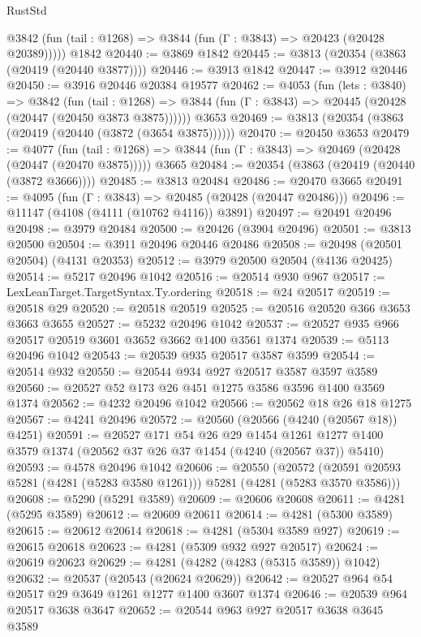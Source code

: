 \begin{lexlean}{RustStd}
\begin{coremodule}
      @3842 (fun (tail : @1268) => @3844 (fun (Γ : @3843) => @20423 (@20428 @20389)))))
    @1842
@20440 := @3869 @1842
@20445 := @3813 (@20354 (@3863 (@20419 (@20440 @3877))))
@20446 := @3913 @1842
@20447 := @3912 @20446
@20450 := @3916 @20446 @20384 @19577
@20462 := @4053
    (fun (lets : @3840) =>
    @3842
      (fun (tail : @1268) =>
      @3844 (fun (Γ : @3843) => @20445 (@20428 (@20447 (@20450 @3873 @3875))))))
    @3653
@20469 := @3813 (@20354 (@3863 (@20419 (@20440 (@3872 (@3654 @3875))))))
@20470 := @20450 @3653
@20479 := @4077
    (fun (tail : @1268) => @3844 (fun (Γ : @3843) => @20469 (@20428 (@20447 (@20470 @3875)))))
    @3665
@20484 := @20354 (@3863 (@20419 (@20440 (@3872 @3666))))
@20485 := @3813 @20484
@20486 := @20470 @3665
@20491 := @4095 (fun (Γ : @3843) => @20485 (@20428 (@20447 @20486)))
@20496 := @11147 (@4108 (@4111 (@10762 @4116)) @3891)
@20497 := @20491 @20496
@20498 := @3979 @20484
@20500 := @20426 (@3904 @20496)
@20501 := @3813 @20500
@20504 := @3911 @20496 @20446 @20486
@20508 := @20498 (@20501 @20504) (@4131 @20353)
@20512 := @3979 @20500 @20504 (@4136 @20425)
@20514 := @5217 @20496 @1042
@20516 := @20514 @930 @967
@20517 := LexLeanTarget.TargetSyntax.Ty.ordering
@20518 := @24 @20517
@20519 := @20518 @29
@20520 := @20518 @20519
@20525 := @20516 @20520 @366 @3653 @3663 @3655
@20527 := @5232 @20496 @1042
@20537 := @20527 @935 @966 @20517 @20519 @3601 @3652 @3662 @1400 @3561 @1374
@20539 := @5113 @20496 @1042
@20543 := @20539 @935 @20517 @3587 @3599
@20544 := @20514 @932
@20550 := @20544 @934 @927 @20517 @3587 @3597 @3589
@20560 := @20527 @52 @173 @26 @451 @1275 @3586 @3596 @1400 @3569 @1374
@20562 := @4232 @20496 @1042
@20566 := @20562 @18 @26 @18 @1275
@20567 := @4241 @20496
@20572 := @20560 (@20566 (@4240 (@20567 @18)) @4251)
@20591 := @20527
    @171
    @54
    @26
    @29
    @1454
    @1261
    @1277
    @1400
    @3579
    @1374
    (@20562 @37 @26 @37 @1454 (@4240 (@20567 @37)) @5410)
@20593 := @4578 @20496 @1042
@20606 := @20550
    (@20572 (@20591 @20593 @5281 (@4281 (@5283 @3580 @1261))) @5281 (@4281 (@5283 @3570 @3586)))
@20608 := @5290 (@5291 @3589)
@20609 := @20606 @20608
@20611 := @4281 (@5295 @3589)
@20612 := @20609 @20611
@20614 := @4281 (@5300 @3589)
@20615 := @20612 @20614
@20618 := @4281 (@5304 @3589 @927)
@20619 := @20615 @20618
@20623 := @4281 (@5309 @932 @927 @20517)
@20624 := @20619 @20623
@20629 := @4281 (@4282 (@4283 (@5315 @3589)) @1042)
@20632 := @20537 (@20543 (@20624 @20629))
@20642 := @20527 @964 @54 @20517 @29 @3649 @1261 @1277 @1400 @3607 @1374
@20646 := @20539 @964 @20517 @3638 @3647
@20652 := @20544 @963 @927 @20517 @3638 @3645 @3589

\end{coremodule}
\end{lexlean}

